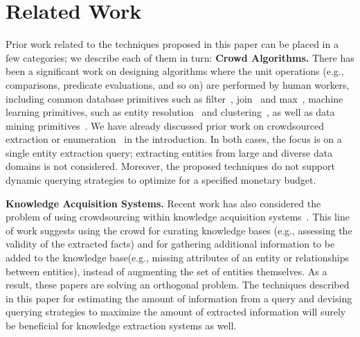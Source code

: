 

\section{Related Work}
\label{sec:related}
Prior work related to the techniques proposed in this paper can be placed in a few categories; we describe each of them in turn:
\iftr
\vspace{3pt}\noindent\textbf{Crowd Algorithms.} There has been a significant work on designing algorithms where the unit operations 
 (e.g., comparisons, predicate evaluations, and so on) 
 are performed by human workers, including common database primitives such as filter~\cite{crowdscreen}, join~\cite{markus-sorts-joins} and max~\cite{so-who-won},  machine learning primitives, such as entity resolution~\cite{ crowder} and clustering~\cite{crowdclustering}, as well as data mining primitives~\cite{amsterdamer:2013, get-another-label}. 
 \fi
We have already
discussed prior work on crowdsourced extraction or enumeration~\cite{park:2014, trushkowsky:2013} in the introduction. 
\iftr
In both cases, the focus is on a single entity extraction query; extracting entities from large and diverse data domains is not considered. Moreover, the proposed techniques do not support  dynamic querying strategies to optimize for a specified monetary budget. 
\fi


\vspace{3pt}\noindent\textbf{Knowledge Acquisition Systems.} Recent work has also considered the problem of using crowdsourcing within knowledge acquisition systems~\cite{jiang:13, kondredi:2014, west:2014}. This line of work suggests using the crowd for curating knowledge bases 
\iftr (e.g., assessing the validity of the extracted facts) 
\fi and for gathering additional information to be added to the knowledge base\iftr (e.g., missing attributes of an entity or relationships between entities)\fi, instead of augmenting the set of entities themselves. 
\iftr As a result, these papers are solving an orthogonal problem. The techniques described in this paper for estimating the amount of information from a query and devising querying strategies to maximize the amount of extracted information will surely be beneficial for knowledge extraction systems as well.
\fi

